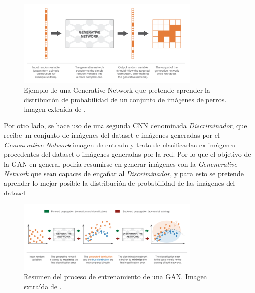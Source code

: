             \begin{figure}[!h]
                \centering
                \includegraphics[width=0.8\textwidth]{img/Generative_network.png}
                \caption{Ejemplo de una Generative Network que pretende aprender la distribución de probabilidad de un conjunto de imágenes de perros. Imagen extraída de \cite{autoencoders2017}.}
                \label{fig:Generative Network}
            \end{figure}
            
            \medskip

            \noindent Por otro lado, se hace uso de una segunda CNN denominada \textit{Discriminador}, que recibe un conjunto de imágenes del dataset e imágenes generadas por el \textit{Genenerative Network} imagen de entrada y trata de clasificarlas en imágenes procedentes del dataset o imágenes generadas por la red. Por lo que el objetivo de la GAN en general podría resumirse en generar imágenes con la \textit{Genenerative Network} que sean capaces de engañar al \textit{Discriminador}, y para esto se pretende aprender lo mejor posible la distribución de probabilidad de las imágenes del dataset.

            \begin{figure}[!h]
                \centering
                \includegraphics[width=0.8\textwidth]{img/proceso_entrenamiento_GAN.png}
                \caption{Resumen del proceso de entrenamiento de una GAN. Imagen extraída de \cite{autoencoders2017}.}
            \end{figure}

